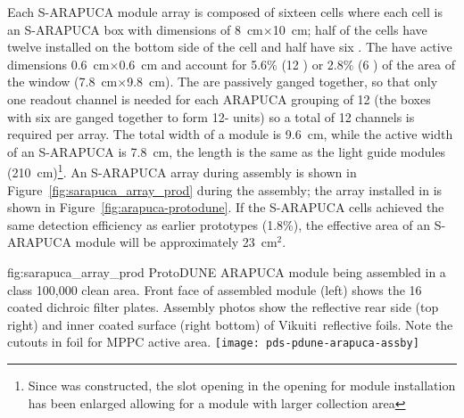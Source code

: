  
Each  S-ARAPUCA module array is composed of sixteen cells where each cell is an S-ARAPUCA box with dimensions of \SI{8}{cm}$\times$\SI{10}{cm}; half of the cells have twelve  installed on the bottom side of the cell and  half have six . The  have active dimensions \SI{0.6}{cm}$\times$\SI{0.6}{cm} and account for 5.6\% (\num{12} ) or \num{2.8}\% (\num{6} ) of the area of the window (\SI{7.8}{cm}$\times$\SI{9.8}{cm}).
The   are passively ganged together, so that only one readout channel is needed for each ARAPUCA grouping of \num{12}  (the boxes with six  are ganged together to form \num{12}- units) so a total of \num{12} channels is required per array. 
The total width of a module is \SI{9.6}{cm}, while the active width of an S-ARAPUCA is \SI{7.8}{cm}, the length is the same as the light guide modules (\SI{210}{cm})\footnote{Since  was constructed, the slot opening in the  opening for  module installation has been enlarged allowing for a module with larger collection area}.
An S-ARAPUCA array during assembly is shown in Figure~\ref{fig:sarapuca_array_prod} during the assembly; the array installed in  is shown in Figure~\ref{fig:arapuca-protodune}. If the S-ARAPUCA cells achieved the same detection efficiency as earlier prototypes (1.8\%), the effective area of an S-ARAPUCA module will be approximately \SI{23}{cm$^2$}.

\begin{dunefigure}{fig:sarapuca_array_prod}
{ProtoDUNE ARAPUCA module being assembled in a class 100,000 clean area.  Front face of assembled module (left) shows the 16 coated dichroic filter plates.  Assembly photos show the reflective rear side (top right) and inner coated surface (right bottom) of Vikuiti\texttrademark\ reflective foils.  Note the cutouts in foil for MPPC active area.}
	\texttt{[image: pds-pdune-arapuca-assby]}
\end{dunefigure}

